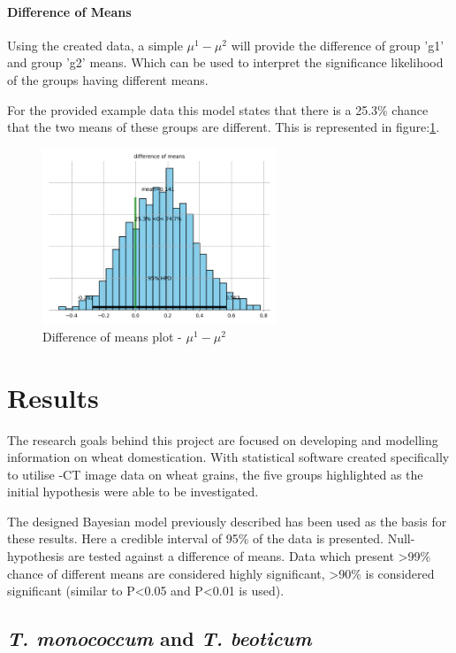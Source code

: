 \documentclass[11pt]{report}
\begin{document}
\subsubsection{Difference of Means}
\label{sec:org041c246}
Using the created data, a simple \(\mu^1 - \mu^2\) will provide the difference of group 'g1' and group 'g2' means. Which can be used to interpret the significance likelihood of the groups having different means.

For the provided example data this model states that there is a 25.3\% chance that the two means of these groups are different. This is represented in figure:\ref{fig:org8b11132}.
\begin{figure}[htbp]
\centering
\includegraphics[width=7cm]{./images/examplebayes2.png}
\caption{\label{fig:org8b11132}
Difference of means plot - \(\mu^1 - \mu^2\)}
\end{figure}



\chapter{Results}
\label{sec:org7061aaf}
The research goals behind this project are focused on developing and modelling information on wheat domestication. With statistical software created specifically to utilise \textmu{}-CT image data on wheat grains, the five groups highlighted as the initial hypothesis were able to be investigated.

The designed Bayesian model previously described has been used as the basis for these results. Here a credible interval of 95\% of the data is presented. Null-hypothesis are tested against a difference of means. Data which present >99\% chance of different means are considered highly significant, >90\% is considered significant (similar to P<0.05 and P<0.01 is used).

\clearpage

\section{\emph{T. monococcum} and \emph{T. beoticum}}
\label{sec:orgf7db62a}
\end{document}
